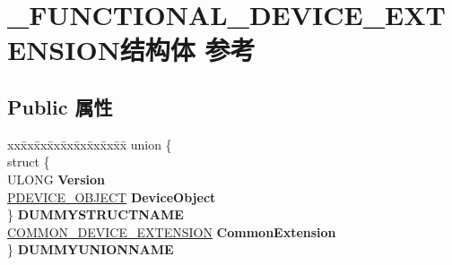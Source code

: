 \hypertarget{struct___f_u_n_c_t_i_o_n_a_l___d_e_v_i_c_e___e_x_t_e_n_s_i_o_n}{}\section{\+\_\+\+F\+U\+N\+C\+T\+I\+O\+N\+A\+L\+\_\+\+D\+E\+V\+I\+C\+E\+\_\+\+E\+X\+T\+E\+N\+S\+I\+O\+N结构体 参考}
\label{struct___f_u_n_c_t_i_o_n_a_l___d_e_v_i_c_e___e_x_t_e_n_s_i_o_n}
\subsection*{Public 属性}
\begin{DoxyCompactItemize}
\item 
\mbox{\label{struct___f_u_n_c_t_i_o_n_a_l___d_e_v_i_c_e___e_x_t_e_n_s_i_o_n_a28937ba58ad12b5c1e63120b760fed9c}} 
\begin{tabbing}
xx\=xx\=xx\=xx\=xx\=xx\=xx\=xx\=xx\=\kill
union \{\\
\>struct \{\\
\>\>ULONG {\bfseries Version}\\
\>\>\hyperlink{struct___d_e_v_i_c_e___o_b_j_e_c_t}{PDEVICE\_OBJECT} {\bfseries DeviceObject}\\
\>\} {\bfseries DUMMYSTRUCTNAME}\\
\>\hyperlink{struct_c_o_m_m_o_n___d_e_v_i_c_e___e_x_t_e_n_s_i_o_n}{COMMON\_DEVICE\_EXTENSION} {\bfseries CommonExtension}\\
\} {\bfseries DUMMYUNIONNAME}\\


\end{tabbing}
\end{DoxyCompactItemize}
